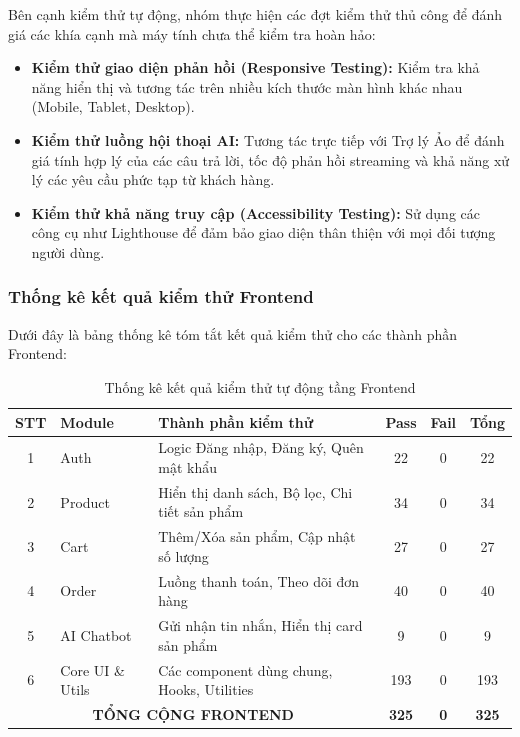 Bên cạnh kiểm thử tự động, nhóm thực hiện các đợt kiểm thử thủ công để đánh giá các khía cạnh mà máy tính chưa thể kiểm tra hoàn hảo:
\begin{itemize}
    \item \textbf{Kiểm thử giao diện phản hồi (Responsive Testing):} Kiểm tra khả năng hiển thị và tương tác trên nhiều kích thước màn hình khác nhau (Mobile, Tablet, Desktop).
    \item \textbf{Kiểm thử luồng hội thoại AI:} Tương tác trực tiếp với Trợ lý Ảo để đánh giá tính hợp lý của các câu trả lời, tốc độ phản hồi streaming và khả năng xử lý các yêu cầu phức tạp từ khách hàng.
    \item \textbf{Kiểm thử khả năng truy cập (Accessibility Testing):} Sử dụng các công cụ như Lighthouse để đảm bảo giao diện thân thiện với mọi đối tượng người dùng.
\end{itemize}

\subsubsection{Thống kê kết quả kiểm thử Frontend}

Dưới đây là bảng thống kê tóm tắt kết quả kiểm thử cho các thành phần Frontend:

\begin{table}[H]
\centering
\small
\begin{tabular}{|c|l|l|c|c|c|}
\hline
\textbf{STT} & \textbf{Module} & \textbf{Thành phần kiểm thử} & \textbf{Pass} & \textbf{Fail} & \textbf{Tổng} \\ \hline
1 & Auth & Logic Đăng nhập, Đăng ký, Quên mật khẩu & 22 & 0 & 22 \\ \hline
2 & Product & Hiển thị danh sách, Bộ lọc, Chi tiết sản phẩm & 34 & 0 & 34 \\ \hline
3 & Cart & Thêm/Xóa sản phẩm, Cập nhật số lượng & 27 & 0 & 27 \\ \hline
4 & Order & Luồng thanh toán, Theo dõi đơn hàng & 40 & 0 & 40 \\ \hline
5 & AI Chatbot & Gửi nhận tin nhắn, Hiển thị card sản phẩm & 9 & 0 & 9 \\ \hline
6 & Core UI \& Utils & Các component dùng chung, Hooks, Utilities & 193 & 0 & 193 \\ \hline
\multicolumn{3}{|c|}{\textbf{TỔNG CỘNG FRONTEND}} & \textbf{325} & \textbf{0} & \textbf{325} \\ \hline
\end{tabular}
\vspace{10pt}
\caption{Thống kê kết quả kiểm thử tự động tầng Frontend}
\label{tab:frontend_test_summary}
\end{table}

